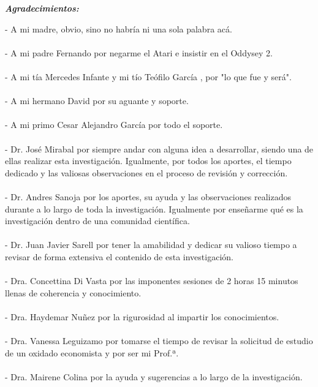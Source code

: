 \newpage
\begin{center}
\large{\textbf{\emph{\Huge{Agradecimientos:}}}}
\end{center}
\thispagestyle{empty}
\vspace*{2cm}
\thispagestyle{empty}

- A mi madre, obvio, sino no habría ni una sola palabra acá.\\\\
- A mi padre Fernando por negarme el Atari e insistir en el Oddysey 2.\\\\
- A mi tía Mercedes Infante y mi tío Teófilo García \textdagger, por "lo que fue y será".\\\\
- A mi hermano David por su aguante y soporte.\\\\
- A mi primo Cesar Alejandro García por todo el soporte.\\\\
- Dr. José Mirabal por siempre andar con alguna idea a desarrollar, siendo una de ellas realizar esta investigación. Igualmente, por todos los aportes, el tiempo dedicado y las valiosas observaciones en el proceso de revisión y corrección.\\\\
- Dr. Andres Sanoja por los aportes, su ayuda y las observaciones realizados durante a lo largo de toda la investigación. Igualmente por enseñarme qué es la investigación dentro de una comunidad científica.\\\\
- Dr. Juan Javier Sarell por tener la amabilidad y dedicar su valioso tiempo a revisar de forma extensiva el contenido de esta investigación.\\\\
- Dra. Concettina Di Vasta por las imponentes sesiones de 2 horas 15 minutos llenas de coherencia y conocimiento.\\\\
- Dra. Haydemar Nuñez por la rigurosidad al impartir los conocimientos.\\\\
- Dra. Vanessa Leguizamo por tomarse el tiempo de revisar la solicitud de estudio de un oxidado economista y por ser mi Prof.ª.\\\\
- Dra. Mairene Colina por la ayuda y sugerencias a lo largo de la investigación.\\\\
